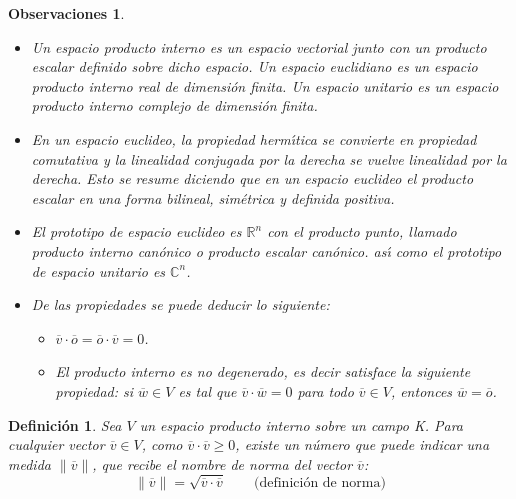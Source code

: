 \documentclass[a4paper,11pt]{article}
\theoremstyle{teoremas}
\theoremstyle{ejemplos}
\theoremstyle{definiciones}
\theoremstyle{lemas}
\newtheorem*{definicion}{Definici\'on}
\newtheorem*{observaciones}{Observaciones}
\begin{document}
\begin{observaciones}
 $\phantom{0}$
 \begin{itemize}
  \item Un espacio producto interno es un espacio vectorial junto con un producto escalar definido sobre dicho espacio.
  Un espacio euclidiano es un espacio producto interno real de dimensi\'on finita.
  Un espacio unitario es un espacio producto interno complejo de dimensi\'on finita.
  
  \item En un espacio euclideo, la propiedad herm\'{\i}tica se convierte en propiedad comutativa y la linealidad conjugada por la derecha se vuelve linealidad por la derecha. Esto se resume diciendo que en un espacio euclideo el producto escalar en una forma bilineal, sim\'etrica y definida positiva.
  
  \item El prototipo de espacio euclideo es $\mathbb{R}^n$ con el producto punto, llamado \textit{producto interno can\'onico} o \textit{producto escalar can\'onico}. as\'{\i} como el prototipo de espacio unitario es $\mathbb{C}^n$.
  
  \item De las propiedades se puede deducir lo siguiente:
  \begin{itemize}
   \item $\overline{v}\cdot \overline{o} = \overline{o}\cdot \overline{v} = 0$.
   \item El producto interno es no degenerado, es decir satisface la siguiente propiedad: si $\overline{w} \in V$ es tal que $\overline{v}\cdot \overline{w} = 0$ para todo $\overline{v} \in V$, entonces $\overline{w} = \overline{o}$.
  \end{itemize}
 \end{itemize}
\end{observaciones}

\begin{definicion}
 Sea $V$ un espacio producto interno sobre un campo K. Para cualquier vector $\overline{v} \in V$, como $\overline{v}\cdot \overline{v} \geq 0$, existe un n\'umero que puede indicar una \textit{medida} $\lVert \overline{v} \rVert$, que recibe el nombre de \textit{norma} del vector $\overline{v}$:
 \begin{equation}
  \lVert \overline{v} \rVert = \sqrt{\overline{v}\cdot \overline{v}} \qquad \text{(definici\'on de norma)}
 \end{equation}
\end{definicion}
\end{document}
